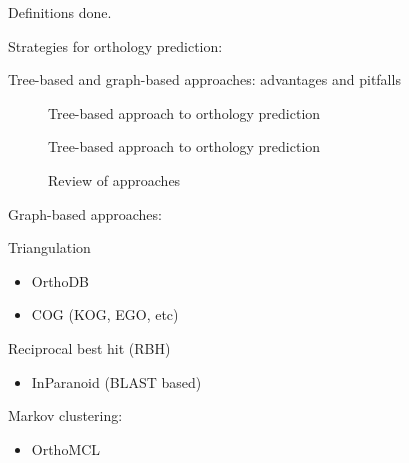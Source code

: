 Definitions done.

Strategies for orthology prediction:

Tree-based and graph-based approaches: advantages and pitfalls

\begin{description}
	\item[\cite{mirkin1995}] Tree-based approach to orthology prediction
	\item[\cite{yuan1998}] Tree-based approach to orthology prediction
	\item[\cite{kuzniar2008}] Review of approaches
\end{description}

Graph-based approaches:

Triangulation

\begin{itemize}
	\item OrthoDB 
	\item COG (KOG, EGO, etc)
\end{itemize}

Reciprocal best hit (RBH) 

\begin{itemize}
	\item InParanoid (BLAST based)
\end{itemize}

Markov clustering:

\begin{itemize}
	\item OrthoMCL
\end{itemize}

